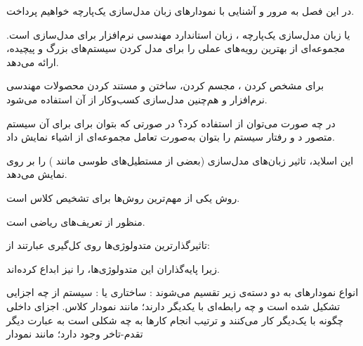 
در این فصل به مرور و آشنایی با نمودارهای زبان مدل‌سازی یک‌پارچه خواهیم پرداخت.





 یا زبان مدل‌سازی یک‌پارچه ، زبان استاندارد مهندسی نرم‌افزار برای مدل‌سازی است. مجموعه‌ای از بهترین رویه‌های عملی  را برای مدل کردن سیستم‌های بزرگ و پیچیده، ارائه می‌دهد.

 برای مشخص کردن ،  مجسم کردن، ساختن  و مستند کردن  محصولات  مهندسی نرم‌افزار و هم‌چنین مدل‌سازی کسب‌وکار از آن استفاده می‌شود.

 در چه صورت می‌توان از  استفاده کرد؟ در صورتی که بتوان برای برای آن سیستم  متصور د و رفتار سیستم را بتوان به‌صورت تعامل مجموعه‌ای از اشیاء نمایش داد. 

 این اسلاید، تاثیر زبان‌های مدل‌سازی (بعضی از مستطیل‌های طوسی مانند ) را بر روی  نمایش می‌دهد. 

 روش   یکی از مهم‌ترین روش‌ها برای تشخیص کلاس است. 

 منظور از  تعریف‌های ریاضی است.

 تاثیرگذارترین متدولوژی‌ها روی کل‌گیری  عبارتند از: 
 
 
 

زیرا پایه‌گذاران این متدولوژی‌ها،  را نیز ابداع کرده‌اند.


انواع نمودارهای  به دو دسته‌ی زیر تقسیم می‌شوند :
 ساختاری یا : سیستم از چه اجزایی تشکیل شده است و چه رابطه‌ای با یکدیگر دارند؛ مانند نمودار کلاس. 
 اجزای داخلی چگونه با یک‌دیگر کار می‌کنند و ترتیب انجام کارها به چه شکلی است به عبارت دیگر تقدم-تاخر وجود دارد؛ مانند نمودار 
